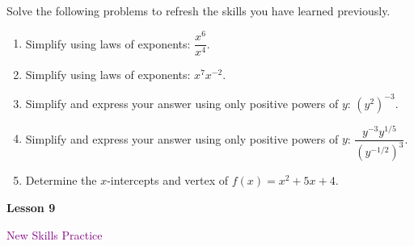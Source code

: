 \documentclass[10pt]{book}
\theoremstyle{definition}
\theoremstyle{remark}
\begin{document}
\begin{large}
\noindent
Solve the following problems to refresh the skills you have learned previously.
\begin{enumerate}
\item Simplify using laws of exponents: $\dfrac{x^6}{x^4}$.\vfil \vfil \vfil
\item Simplify using laws of exponents: $x^{7}x^{-2}$.\vfil \vfil \vfil
\item Simplify and express your answer using only positive powers of $y$: $(y^{2})^{-3}$.\vfil \vfil\vfil
\item Simplify and express your answer using only positive powers of $y$: $\dfrac{y^{-3} y^{1/5}}{(y^{-1/2})^{3}}$.\vfil \vfil \vfil
\item Determine the $x$-intercepts and vertex of $f(x) = x^{2}+5x+4$. \vfil \vfil \vfil
\end{enumerate}
\end{large}
\newpage


\begin{tcolorbox}[
  width=\textwidth,
  colback=gray!10, %
  colframe=white, %
  boxrule=0pt,    %
  left=1cm,       %
  right=1cm,      %
  sharp corners  %
]

\begin{minipage}[t]{0.5\textwidth}
  \Huge \textbf{Lesson 9}
\end{minipage}%
\hfill
\begin{minipage}[t]{0.5\textwidth}
  \Huge\textcolor{purple}{New Skills Practice}
\end{minipage}
\end{tcolorbox}
\end{document}
